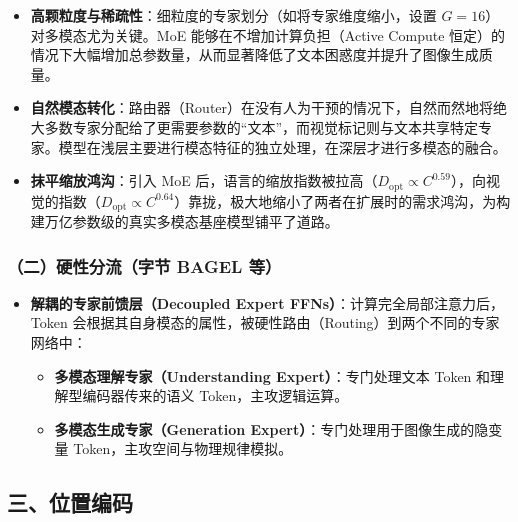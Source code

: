 \begin{itemize}
\tightlist
\item
  \textbf{高颗粒度与稀疏性}：细粒度的专家划分（如将专家维度缩小，设置 \(G=16\)）对多模态尤为关键。MoE 能够在不增加计算负担（Active Compute 恒定）的情况下大幅增加总参数量，从而显著降低了文本困惑度并提升了图像生成质量。
\item
  \textbf{自然模态转化}：路由器（Router）在没有人为干预的情况下，自然而然地将绝大多数专家分配给了更需要参数的``文本''，而视觉标记则与文本共享特定专家。模型在浅层主要进行模态特征的独立处理，在深层才进行多模态的融合。
\item
  \textbf{抹平缩放鸿沟}：引入 MoE 后，语言的缩放指数被拉高（\(D_{\mathrm{opt}}\propto C^{0.59}\)），向视觉的指数（\(D_{\mathrm{opt}}\propto C^{0.64}\)）靠拢，极大地缩小了两者在扩展时的需求鸿沟，为构建万亿参数级的真实多模态基座模型铺平了道路。
\end{itemize}

\hypertarget{ux4e8cux786cux6027ux5206ux6d41ux5b57ux8282-bagel-ux7b49}{%
\subsubsection{（二）硬性分流（字节 BAGEL 等）}\label{ux4e8cux786cux6027ux5206ux6d41ux5b57ux8282-bagel-ux7b49}}

\begin{itemize}
\tightlist
\item
{}
  \textbf{解耦的专家前馈层（Decoupled Expert FFNs）}：计算完全局部注意力后，Token 会根据其自身模态的属性，被硬性路由（Routing）到两个不同的专家网络中：

  \begin{itemize}
  \tightlist
  \item
    \textbf{多模态理解专家（Understanding Expert）}：专门处理文本 Token 和理解型编码器传来的语义 Token，主攻逻辑运算。
  \item
    \textbf{多模态生成专家（Generation Expert）}：专门处理用于图像生成的隐变量 Token，主攻空间与物理规律模拟。
  \end{itemize}
\end{itemize}

\hypertarget{ux4e09ux4f4dux7f6eux7f16ux7801}{%
\subsection{三、位置编码}\label{ux4e09ux4f4dux7f6eux7f16ux7801}}

